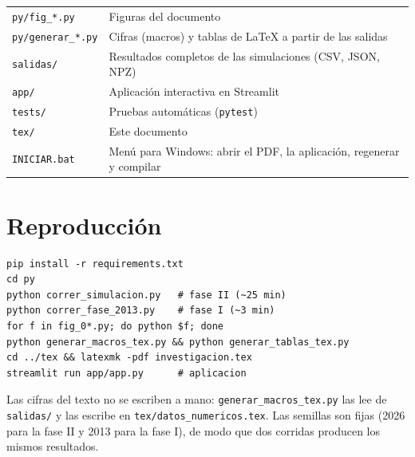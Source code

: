 {\begin{longtable}{p{5.6cm}p{9.4cm}}
\texttt{py/fig\_*.py} & Figuras del documento \\
\texttt{py/generar\_*.py} & Cifras (macros) y tablas de \LaTeX{} a partir de las salidas \\
\texttt{salidas/} & Resultados completos de las simulaciones (CSV, JSON, NPZ) \\
\texttt{app/} & Aplicación interactiva en Streamlit \\
\texttt{tests/} & Pruebas automáticas (\texttt{pytest}) \\
\texttt{tex/} & Este documento \\
\texttt{INICIAR.bat} & Menú para Windows: abrir el PDF, la aplicación, regenerar y compilar \\
\bottomrule
\end{longtable}}

\section{Reproducción}

\begin{verbatim}
pip install -r requirements.txt
cd py
python correr_simulacion.py   # fase II (~25 min)
python correr_fase_2013.py    # fase I (~3 min)
for f in fig_0*.py; do python $f; done
python generar_macros_tex.py && python generar_tablas_tex.py
cd ../tex && latexmk -pdf investigacion.tex
streamlit run app/app.py      # aplicacion
\end{verbatim}

Las cifras del texto no se escriben a mano: \texttt{generar\_macros\_tex.py} las lee de
\texttt{salidas/} y las escribe en \texttt{tex/datos\_numericos.tex}. Las semillas son fijas (2026 para
la fase II y 2013 para la fase I), de modo que dos corridas producen los mismos resultados.
